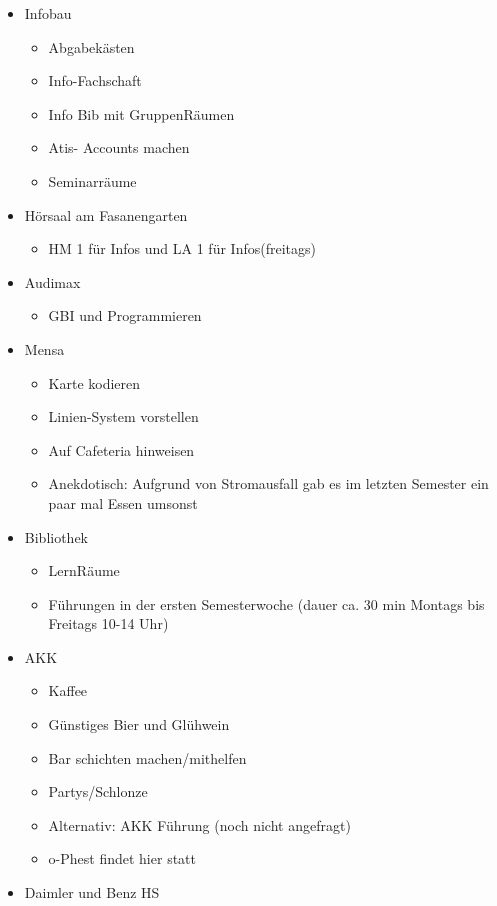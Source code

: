 \documentclass[10pt,twocolumn,ngerman]{scrartcl}
\begin{document}
\begin{itemize}
\item Infobau
\begin{itemize}
\item Abgabekästen
\item Info-Fachschaft
\item Info Bib mit GruppenRäumen
\item Atis- Accounts machen
\item Seminarräume
\end{itemize}
\item Hörsaal am Fasanengarten
\begin{itemize}
\item HM 1 für Infos und LA 1 für Infos(freitags)
\end{itemize}
\item Audimax
\begin{itemize}
\item GBI und Programmieren
\end{itemize}
\item Mensa
\begin{itemize}
\item Karte kodieren
\item Linien-System vorstellen
\item Auf Cafeteria hinweisen 
\item Anekdotisch: Aufgrund von Stromausfall gab es im letzten Semester
ein paar mal Essen umsonst
\end{itemize}
\item Bibliothek
\begin{itemize}
\item LernRäume
\item Führungen in der ersten Semesterwoche (dauer ca. 30 min Montags bis
Freitags 10-14 Uhr)
\end{itemize}
\item AKK
\begin{itemize}
\item Kaffee 
\item Günstiges Bier und Glühwein 
\item Bar schichten machen/mithelfen 
\item Partys/Schlonze 
\item Alternativ: AKK Führung (noch nicht angefragt) 
\item o-Phest findet hier statt
\end{itemize}
\item Daimler und Benz HS
\begin{itemize}

\end{itemize}
\end{itemize}
\end{document}
